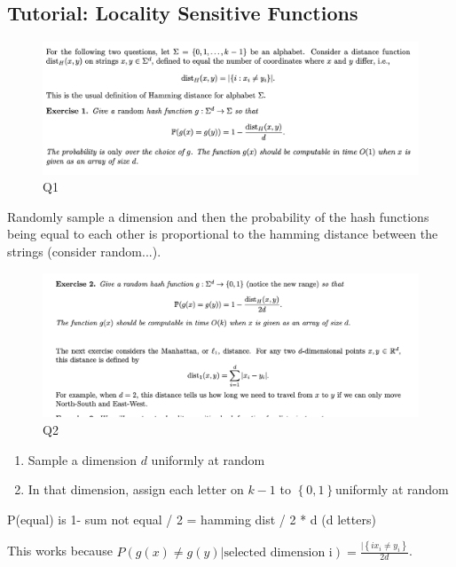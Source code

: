 \documentclass[../notes.tex]{subfiles}
\begin{document}
\subsection{Tutorial: Locality Sensitive Functions}

\begin{blockquote}
    \begin{figure}[H]
        \centering
        \includegraphics[width=0.8\linewidth]{img/image_2023-01-25-12-12-15.png}
        \caption{Q1}
    \end{figure}
\end{blockquote}


Randomly sample a dimension and then the probability of the hash functions being equal to each other is proportional to the hamming distance between the strings (consider random...).

\begin{figure}[H]
    \centering
    \includegraphics[width=0.8\linewidth]{img/image_2023-01-25-12-39-13.png}
    \caption{Q2}
\end{figure}


\begin{enumerate}
    \item Sample a dimension $ d $ uniformly at random
    \item In that dimension, assign each letter on $ k-1 $ to $ \left\{ 0, 1 \right\}  $uniformly at random
\end{enumerate}


P(equal) is 1-  sum not equal / 2 = hamming dist / 2 * d (d letters)

This works because $ P(g(x) \neq  g(y) | \text{selected dimension i}) = \frac{|\left\{ i x_i \neq  y_i \right\} }{2d} $.
\end{document}
